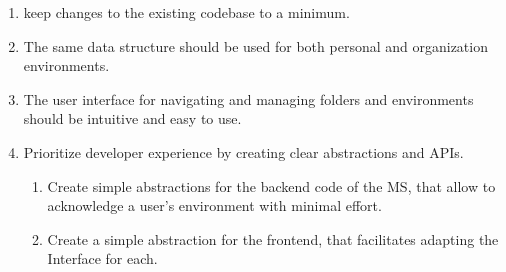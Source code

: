 \begin{enumerate}
	\item keep changes to the existing codebase to a minimum.

	\item The same data structure should be used for both personal and organization environments.


	\item The user interface for navigating and managing folders and environments should
	      be intuitive and easy to use.

	\item Prioritize developer experience by creating clear abstractions and APIs.
	      \begin{enumerate}
		      \item Create simple abstractions for the backend code of the MS, that allow to acknowledge a user's environment with minimal effort.
		      \item Create a simple abstraction for the frontend, that facilitates adapting
		            the Interface for each.
	      \end{enumerate}

\end{enumerate}





